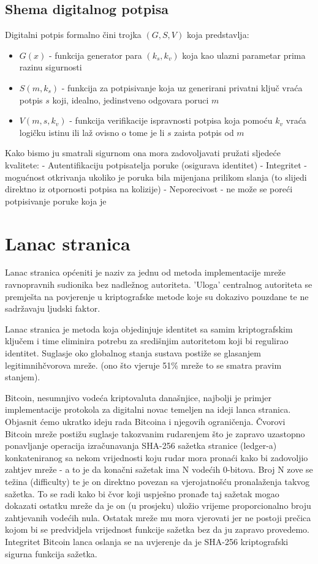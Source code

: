 \documentclass[utf8, zavrsni]{fer}
\begin{document}
\section{Shema digitalnog potpisa}
Digitalni potpis formalno čini trojka $(G, S, V)$ koja predstavlja:
\begin{itemize}
	\item $G(x)$ - funkcija generator para $(k_{s}, k_{v})$ koja kao ulazni parametar prima razinu sigurnosti
	\item $S(m, k_{s})$ - funkcija za potpisivanje koja uz generirani privatni ključ vraća potpis $s$ koji, idealno, jedinstveno odgovara poruci $m$
	\item $V(m, s, k_{v})$ - funkcija verifikacije ispravnosti potpisa koja pomoću $k_{v}$ vraća logičku istinu ili laž ovisno o tome je li $s$ zaista potpis od $m$
\end{itemize}
Kako bismo ju smatrali sigurnom ona mora zadovoljavati pružati sljedeće kvalitete:
- Autentifikaciju potpisatelja poruke (osigurava identitet)
- Integritet - mogućnost otkrivanja ukoliko je poruka bila mijenjana prilikom slanja (to slijedi direktno iz otpornosti potpisa na kolizije)
- Neporecivost - ne može se poreći potpisivanje poruke koja je

\chapter{Lanac stranica}
Lanac stranica općeniti je naziv za jednu od metoda implementacije mreže ravnopravnih sudionika bez nadležnog autoriteta. 'Uloga' centralnog autoriteta se premješta na povjerenje u kriptografske metode koje su dokazivo pouzdane te ne sadržavaju ljudski faktor.

Lanac stranica je metoda koja objedinjuje identitet sa samim kriptografskim ključem i time eliminira potrebu za središnjim autoritetom koji bi regulirao identitet. Suglasje oko globalnog stanja sustava postiže se glasanjem legitimnih\footnotemark čvorova mreže. (ono što vjeruje 51\% mreže to se smatra pravim stanjem).

Bitcoin, nesumnjivo vodeća kriptovaluta današnjice, najbolji je primjer implementacije protokola za digitalni novac temeljen na ideji lanca stranica. Objasnit ćemo ukratko ideju rada Bitcoina i njegovih ograničenja. Čvorovi Bitcoin mreže postižu suglasje takozvanim rudarenjem što je zapravo uzastopno ponavljanje operacija izračunavanja SHA-256 sažetka stranice (ledger-a) konkateniranog sa nekom vrijednosti koju rudar mora pronaći kako bi zadovoljio zahtjev mreže - a to je da konačni sažetak ima N vodećih 0-bitova. Broj N zove se težina (difficulty) te je on direktno povezan sa vjerojatnošću pronalaženja takvog sažetka. To se radi kako bi čvor koji uspješno pronađe taj sažetak mogao dokazati ostatku mreže da je on (u prosjeku) uložio vrijeme proporcionalno broju zahtjevanih vodećih nula. Ostatak mreže mu mora vjerovati jer ne postoji prečica kojom bi se predvidjela vrijednost funkcije sažetka bez da ju zapravo provedemo. Integritet Bitcoin lanca oslanja se na uvjerenje da je SHA-256 kriptografski sigurna funkcija sažetka.
\end{document}
